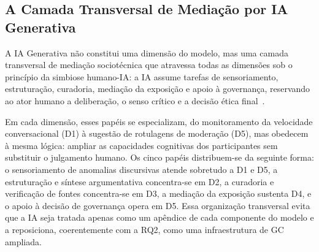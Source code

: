 \documentclass[conference]{IEEEtran} \IEEEoverridecommandlockouts %
\begin{document}


\subsection{A Camada Transversal de Mediação por IA Generativa}

A IA Generativa não constitui uma dimensão do modelo, mas uma camada transversal de mediação sociotécnica que atravessa todas as dimensões sob o princípio da simbiose humano-IA: a IA assume tarefas de sensoriamento, estruturação, curadoria, mediação da exposição e apoio à governança, reservando ao ator humano a deliberação, o senso crítico e a decisão ética final~\cite{jarrahiArtificialIntelligenceKnowledge2023}.

Em cada dimensão, esses papéis se especializam, do monitoramento da velocidade conversacional (D1) à sugestão de rotulagens de moderação (D5), mas obedecem à mesma lógica: ampliar as capacidades cognitivas dos participantes sem substituir o julgamento humano. Os cinco papéis distribuem-se da seguinte forma: o sensoriamento de anomalias discursivas atende sobretudo a D1 e D5, a estruturação e síntese argumentativa concentra-se em D2, a curadoria e verificação de fontes concentra-se em D3, a mediação da exposição sustenta D4, e o apoio à decisão de governança opera em D5. Essa organização transversal evita que a IA seja tratada apenas como um apêndice de cada componente do modelo e a reposiciona, coerentemente com a RQ2, como uma infraestrutura de GC ampliada.
\end{document}

